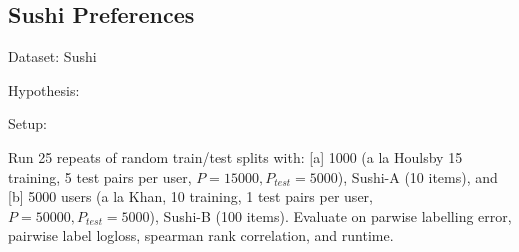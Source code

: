 
\subsection{Sushi Preferences}\label{sec:sushi}

Dataset: Sushi

Hypothesis: 


Setup:

Run 25 repeats of random train/test splits with:
% 
[a] 1000 (a la Houlsby 15 training, 5 test pairs per user, $P=15000,P_{test}=5000$), Sushi-A (10 items), 
and [b] 5000 users (a la Khan, 10 training, 1 test pairs per user, $P=50000, P_{test}=5000$), Sushi-B (100 items).
Evaluate on parwise labelling error, pairwise label logloss, spearman rank correlation,
and runtime.

